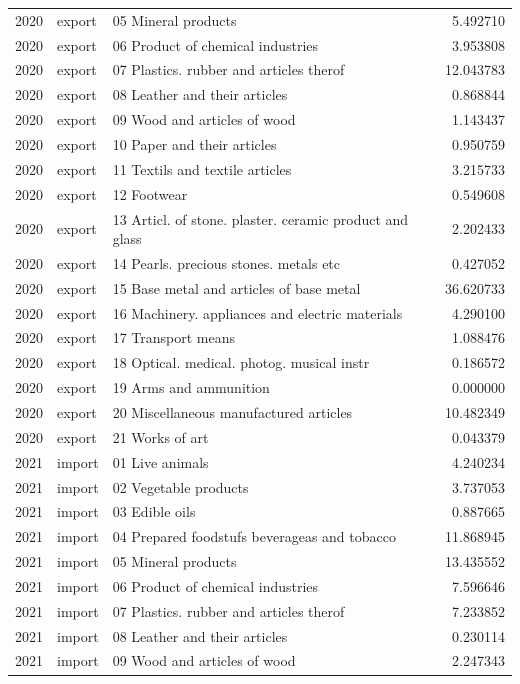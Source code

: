 \begin{tabular}{rllr}
2020 & export & 05 Mineral products & 5.492710 \\
2020 & export & 06 Product of chemical industries & 3.953808 \\
2020 & export & 07 Plastics. rubber and articles therof & 12.043783 \\
2020 & export & 08 Leather and their articles & 0.868844 \\
2020 & export & 09 Wood and articles of wood & 1.143437 \\
2020 & export & 10 Paper and their articles & 0.950759 \\
2020 & export & 11 Textils and textile articles & 3.215733 \\
2020 & export & 12 Footwear & 0.549608 \\
2020 & export & 13 Articl. of stone. plaster. ceramic product and glass & 2.202433 \\
2020 & export & 14 Pearls. precious stones. metals etc & 0.427052 \\
2020 & export & 15 Base metal and articles of base metal & 36.620733 \\
2020 & export & 16 Machinery. appliances and electric materials & 4.290100 \\
2020 & export & 17 Transport means & 1.088476 \\
2020 & export & 18 Optical. medical. photog. musical instr & 0.186572 \\
2020 & export & 19 Arms and ammunition & 0.000000 \\
2020 & export & 20 Miscellaneous manufactured articles & 10.482349 \\
2020 & export & 21 Works of art & 0.043379 \\
2021 & import & 01 Live animals & 4.240234 \\
2021 & import & 02 Vegetable products & 3.737053 \\
2021 & import & 03 Edible oils & 0.887665 \\
2021 & import & 04 Prepared foodstufs beverageas and tobacco & 11.868945 \\
2021 & import & 05 Mineral products & 13.435552 \\
2021 & import & 06 Product of chemical industries & 7.596646 \\
2021 & import & 07 Plastics. rubber and articles therof & 7.233852 \\
2021 & import & 08 Leather and their articles & 0.230114 \\
2021 & import & 09 Wood and articles of wood & 2.247343 \\

\end{tabular}
